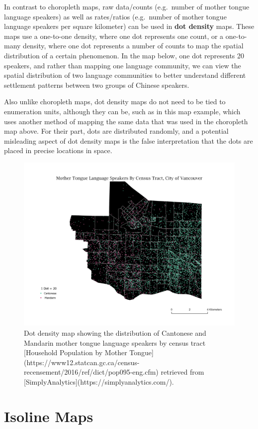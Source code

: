 \documentclass[
]{book}
\begin{document}
In contrast to choropleth maps, raw data/counts (e.g.~number of mother tongue language speakers) as well as rates/ratios (e.g.~number of mother tongue language speakers per square kilometer) can be used in \textbf{dot density} maps. These maps use a one-to-one density, where one dot represents one count, or a one-to-many density, where one dot represents a number of counts to map the spatial distribution of a certain phenomenon. In the map below, one dot represents 20 speakers, and rather than mapping one language community, we can view the spatial distribution of two language communities to better understand different settlement patterns between two groups of Chinese speakers.

Also unlike choropleth maps, dot density maps do not need to be tied to enumeration units, although they can be, such as in this map example, which uses another method of mapping the same data that was used in the choropleth map above. For their part, dots are distributed randomly, and a potential misleading aspect of dot density maps is the false interpretation that the dots are placed in precise locations in space.

\begin{figure}
\includegraphics[width=0.8\linewidth]{images/17-dotDensity} \caption{Dot density map showing the distribution of Cantonese and Mandarin mother tongue language speakers by census tract [Household Population by Mother Tongue](https://www12.statcan.gc.ca/census-recensement/2016/ref/dict/pop095-eng.cfm) retrieved from [SimplyAnalytics](https://simplyanalytics.com/).}\label{fig:17-dotDensity}
\end{figure}

\hypertarget{isoline-maps}{%
\section{Isoline Maps}\label{isoline-maps}}
\end{document}
